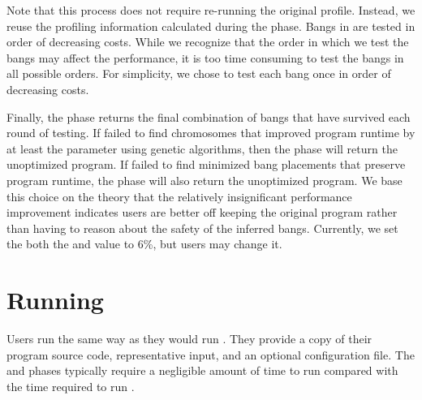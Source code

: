 Note that this process does not require re-running the original
profile.  Instead, we reuse the profiling information calculated
during the \preopt{} phase.  Bangs in \hotspots{} are tested in order
of decreasing costs. While we recognize that the order in which we
test the bangs may affect the performance, it is too time consuming to
test the bangs in all possible orders.  For simplicity, we chose to
test each bang once in order of decreasing costs.

Finally, the \postopt{} phase returns the final combination of bangs
that have survived each round of testing. If \Ao{} failed to find
chromosomes that improved program runtime by at least the
\overallThreshold{} parameter using genetic algorithms, then
the \postopt{} phase will return the unoptimized program.
If \At{} failed to find minimized bang placements that preserve 
program runtime, the \postopt{} phase will also 
return the unoptimized program. We base this choice on the
theory that the relatively insignificant performance improvement
indicates users are better off keeping the original program rather
than having to reason about the safety of the inferred bangs.
Currently, we set the both the \overallThreshold{} and \absim{}
value to 6\%, but users may change it. 


\section{Running \At{}}

Users run \At{} the same way as they would run \Ao{}. They
provide a copy of their program source code, representative input,
and an optional configuration file. The \preopt{}
and \postopt{} phases typically require a negligible amount of time
to run compared with the time required to run \Ao{}.

